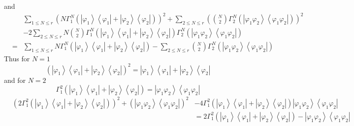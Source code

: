 \documentclass[12pt]{article}
\begin{document}
and 
\begin{eqnarray*}
&&\sum_{1\leq N\leq r}\left( N\Gamma _{1}^{N}\left( \left\vert \varphi
_{1}\right\rangle \left\langle \varphi _{1}\right\vert +\left\vert \varphi
_{2}\right\rangle \left\langle \varphi _{2}\right\vert \right) \right)
^{2}+\sum_{2\leq N\leq r}\left( \binom{N}{2}\Gamma _{2}^{N}\left( \left\vert
\varphi _{1}\varphi _{2}\right\rangle \left\langle \varphi _{1}\varphi
_{2}\right\vert \right) \right) ^{2} \\
&&-2\sum_{2\leq N\leq r}N\binom{N}{2}\Gamma _{1}^{N}\left( \left\vert
\varphi _{1}\right\rangle \left\langle \varphi _{1}\right\vert +\left\vert
\varphi _{2}\right\rangle \left\langle \varphi _{2}\right\vert \right)
\Gamma _{2}^{N}\left( \left\vert \varphi _{1}\varphi _{2}\right\rangle
\left\langle \varphi _{1}\varphi _{2}\right\vert \right) \\
&=&\sum_{1\leq N\leq r}N\Gamma _{1}^{N}\left( \left\vert \varphi
_{1}\right\rangle \left\langle \varphi _{1}\right\vert +\left\vert \varphi
_{2}\right\rangle \left\langle \varphi _{2}\right\vert \right) -\sum_{2\leq
N\leq r}\binom{N}{2}\Gamma _{2}^{N}\left( \left\vert \varphi _{1}\varphi
_{2}\right\rangle \left\langle \varphi _{1}\varphi _{2}\right\vert \right)
\end{eqnarray*}%
Thus for $N=1$ 
\begin{equation*}
\left( \left\vert \varphi _{1}\right\rangle \left\langle \varphi
_{1}\right\vert +\left\vert \varphi _{2}\right\rangle \left\langle \varphi
_{2}\right\vert \right) ^{2}=\left\vert \varphi _{1}\right\rangle
\left\langle \varphi _{1}\right\vert +\left\vert \varphi _{2}\right\rangle
\left\langle \varphi _{2}\right\vert
\end{equation*}%
and for $N=2$%
\begin{equation*}
\Gamma _{1}^{2}\left( \left\vert \varphi _{1}\right\rangle \left\langle
\varphi _{1}\right\vert +\left\vert \varphi _{2}\right\rangle \left\langle
\varphi _{2}\right\vert \right) =\left\vert \varphi _{1}\varphi
_{2}\right\rangle \left\langle \varphi _{1}\varphi _{2}\right\vert
\end{equation*}%
\begin{eqnarray*}
&\left( 2\Gamma _{1}^{2}\left( \left\vert \varphi _{1}\right\rangle
\left\langle \varphi _{1}\right\vert +\left\vert \varphi _{2}\right\rangle
\left\langle \varphi _{2}\right\vert \right) \right) ^{2}+\left( \left\vert
\varphi _{1}\varphi _{2}\right\rangle \left\langle \varphi _{1}\varphi
_{2}\right\vert \right) ^{2}&-4\Gamma _{1}^{2}\left( \left\vert \varphi
_{1}\right\rangle \left\langle \varphi _{1}\right\vert +\left\vert \varphi
_{2}\right\rangle \left\langle \varphi _{2}\right\vert \right) \left\vert
\varphi _{1}\varphi _{2}\right\rangle \left\langle \varphi _{1}\varphi
_{2}\right\vert \\
&&\left. =2\right. \Gamma _{1}^{2}\left( \left\vert \varphi
_{1}\right\rangle \left\langle \varphi _{1}\right\vert +\left\vert \varphi
_{2}\right\rangle \left\langle \varphi _{2}\right\vert \right) -\left\vert
\varphi _{1}\varphi _{2}\right\rangle \left\langle \varphi _{1}\varphi
_{2}\right\vert
\end{eqnarray*}%
\end{document}
